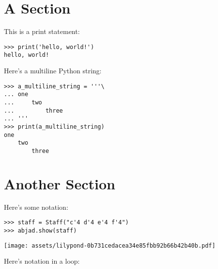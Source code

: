 \documentclass{article}
\begin{document}
\section{A Section}

This is a print statement:

\begin{comment}
<abjad>
print('hello, world!')
</abjad>
\end{comment}

\begin{lstlisting}
>>> print('hello, world!')
hello, world!
\end{lstlisting}

Here's a multiline Python string:

\begin{comment}
<abjad>
a_multiline_string = '''\
one
    two
        three
'''
print(a_multiline_string)
</abjad>
\end{comment}

\begin{lstlisting}
>>> a_multiline_string = '''\
... one
...     two
...         three
... '''
>>> print(a_multiline_string)
one
    two
        three
\end{lstlisting}

\section{Another Section}

Here's some notation:

\begin{comment}
<abjad>
staff = Staff("c'4 d'4 e'4 f'4")
abjad.show(staff)
</abjad>
\end{comment}

\begin{lstlisting}
>>> staff = Staff("c'4 d'4 e'4 f'4")
>>> abjad.show(staff)
\end{lstlisting}
\noindent\texttt{[image: assets/lilypond-0b731cedacea34e85fbb92b66b42b40b.pdf]}

Here's notation in a loop:

\begin{comment}
<abjad>
for leaf in iterate(staff).leaves():
    duration = inspect(leaf).get_duration()
    print(duration)
    abjad.show(leaf)

</abjad>
\end{comment}
\end{document}
